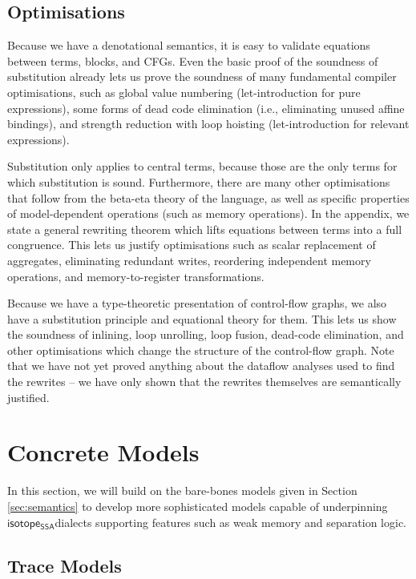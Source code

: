 \documentclass[acmsmall,screen,review]{acmart}
\newcommand{\ms}[1]{\ensuremath{\mathsf{#1}}}
\newcommand{\isotopessa}{\ms{isotope_{SSA}}}
\begin{document}
\subsection{Optimisations}

Because we have a denotational semantics, it is easy to validate equations
between terms, blocks, and CFGs. Even the basic proof of the soundness of
substitution already lets us prove the soundness of many fundamental compiler
optimisations, such as global value numbering (let-introduction for pure
expressions), some forms of dead code elimination (i.e., eliminating unused
affine bindings), and strength reduction with loop hoisting (let-introduction
for relevant expressions). 

Substitution only applies to central terms, because those are the only terms for
which substitution is sound. Furthermore, there are many other optimisations
that follow from the beta-eta theory of the language, as well as specific
properties of model-dependent operations (such as memory operations). In the
appendix, we state a general rewriting theorem which lifts equations between
terms into a full congruence. This lets us justify optimisations such as scalar
replacement of aggregates, eliminating redundant writes, reordering independent
memory operations, and memory-to-register transformations.

Because we have a type-theoretic presentation of control-flow graphs, we also
have a substitution principle and equational theory for them. This lets us show
the soundness of inlining, loop unrolling, loop fusion, dead-code elimination,
and other optimisations which change the structure of the control-flow graph.
Note that we have not yet proved anything about the dataflow analyses used to
find the rewrites -- we have only shown that the rewrites themselves are
semantically justified.

\section{Concrete Models}

In this section, we will build on the bare-bones models given in Section
\ref{sec:semantics} to develop more sophisticated models capable of underpinning
\isotopessa dialects supporting features such as weak memory and separation
logic.

\subsection{Trace Models}
\end{document}
